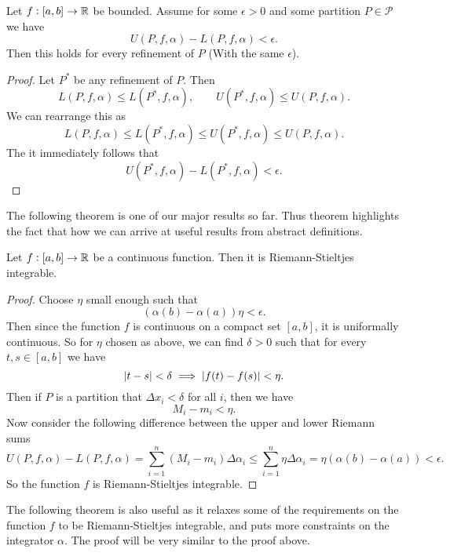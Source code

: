 \begin{corollary}
	Let $f:[a,b]\to\mathbb{R}$ be bounded. Assume for some $\epsilon>0$ and some partition $P \in \mathcal{P}$ we have
	\[ U(P,f,\alpha) - L(P,f,\alpha) < \epsilon. \]
	Then this holds for every refinement of $P$ (With the same $\epsilon$).
\end{corollary}
\begin{proof}
	Let $P^*$ be any refinement of $P$. Then 
	\[ L(P,f,\alpha) \leq L(P^*,f,\alpha),\qquad U(P^*,f,\alpha)\leq U(P,f,\alpha).  \]
	We can rearrange this as
	\[ L(P,f,\alpha) \leq L(P^*,f,\alpha) \leq U(P^*,f,\alpha) \leq U(P,f,\alpha). \]
	The it immediately follows that
	\[ U(P^*,f,\alpha) - L(P^*,f,\alpha) < \epsilon. \]
\end{proof}

The following theorem is one of our major results so far. Thus theorem highlights the fact that how we can arrive at useful results from abstract definitions. 

\begin{theorem}
	Let $f:[a,b] \to \mathbb{R}$ be a continuous function. Then it is Riemann-Stieltjes integrable.
\end{theorem}
\begin{proof}
	Choose $\eta$ small enough such that 
	$$(\alpha(b) - \alpha(a))\eta < \epsilon.$$
	Then since the function $f$ is continuous on a compact set $[a,b]$, it is uniformally continuous. So for $\eta$ chosen as above, we can find $\delta>0$ such that for every $t,s \in [a,b]$ we have
	\[ |t-s| < \delta \implies |f(t) - f(s)| < \eta. \]
	Then if $P$ is a partition that $\Delta x_i < \delta$ for all $i$, then we have
	\[ M_i - m_i < \eta. \]
	Now consider the following difference between the upper and lower Riemann sums 
	\[ U(P,f,\alpha) - L(P,f,\alpha) = \sum_{i=1}^{n} (M_i-m_i) \Delta \alpha_i \leq \sum_{i=1}^{n}\eta \Delta\alpha_i = \eta (\alpha(b) - \alpha(a)) < \epsilon.  \]
	So the function $f$ is Riemann-Stieltjes integrable.
\end{proof}

The following theorem is also useful as it relaxes some of the requirements on the function $f$ to be Riemann-Stieltjes integrable, and puts more constraints on the integrator $\alpha$. The proof will be very similar to the proof above.

